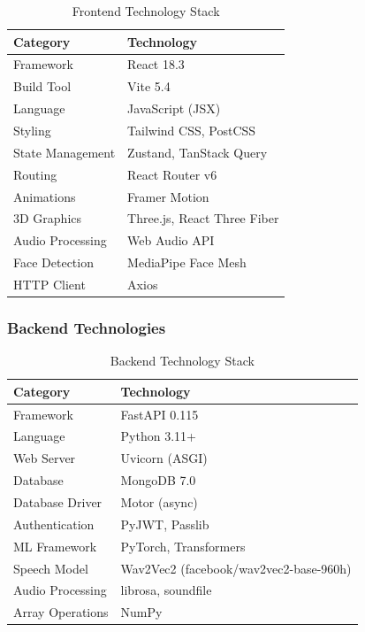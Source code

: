 \documentclass[12pt,a4paper]{article}
\begin{document}
\begin{table}[h]
\centering
\caption{Frontend Technology Stack}
\begin{tabular}{ll}
\toprule
\textbf{Category} & \textbf{Technology} \\
\midrule
Framework & React 18.3 \\
Build Tool & Vite 5.4 \\
Language & JavaScript (JSX) \\
Styling & Tailwind CSS, PostCSS \\
State Management & Zustand, TanStack Query \\
Routing & React Router v6 \\
Animations & Framer Motion \\
3D Graphics & Three.js, React Three Fiber \\
Audio Processing & Web Audio API \\
Face Detection & MediaPipe Face Mesh \\
HTTP Client & Axios \\
\bottomrule
\end{tabular}
\end{table}

\subsubsection{Backend Technologies}

\begin{table}[h]
\centering
\caption{Backend Technology Stack}
\begin{tabular}{ll}
\toprule
\textbf{Category} & \textbf{Technology} \\
\midrule
Framework & FastAPI 0.115 \\
Language & Python 3.11+ \\
Web Server & Uvicorn (ASGI) \\
Database & MongoDB 7.0 \\
Database Driver & Motor (async) \\
Authentication & PyJWT, Passlib \\
ML Framework & PyTorch, Transformers \\
Speech Model & Wav2Vec2 (facebook/wav2vec2-base-960h) \\
Audio Processing & librosa, soundfile \\
Array Operations & NumPy \\
\bottomrule
\end{tabular}
\end{table}
\end{document}
